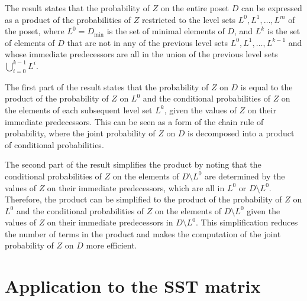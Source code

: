 \documentclass[11pt]{amsart}
\begin{document}
The result states that the probability of $Z$ on the entire poset $D$ can be expressed as a product of the probabilities of $Z$ restricted to the level sets $L^0, L^1, \ldots, L^m$ of the poset, where $L^0 = D_{\text{min}}$ is the set of minimal elements of $D$, and $L^k$ is the set of elements of $D$ that are not in any of the previous level sets $L^0, L^1, \ldots, L^{k-1}$ and whose immediate predecessors are all in the union of the previous level sets $\bigcup_{i=0}^{k-1} L^i$.

The first part of the result states that the probability of $Z$ on $D$ is equal to the product of the probability of $Z$ on $L^0$ and the conditional probabilities of $Z$ on the elements of each subsequent level set $L^k$, given the values of $Z$ on their immediate predecessors. This can be seen as a form of the chain rule of probability, where the joint probability of $Z$ on $D$ is decomposed into a product of conditional probabilities.

The second part of the result simplifies the product by noting that the conditional probabilities of $Z$ on the elements of $D\setminus L^0$ are determined by the values of $Z$ on their immediate predecessors, which are all in $L^0$ or $D\setminus L^0$. Therefore, the product can be simplified to the product of the probability of $Z$ on $L^0$ and the conditional probabilities of $Z$ on the elements of $D\setminus L^0$ given the values of $Z$ on their immediate predecessors in $D\setminus L^0$. This simplification reduces the number of terms in the product and makes the computation of the joint probability of $Z$ on $D$ more efficient.




\newpage







\section{Application to the SST matrix}
\end{document}
